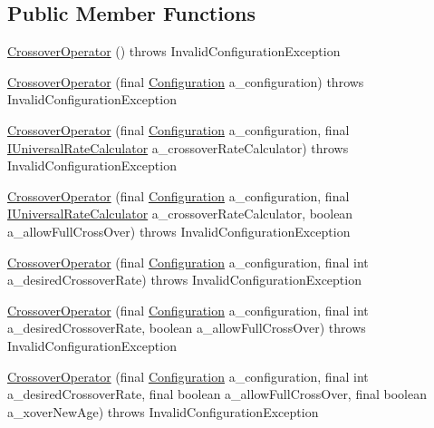 \subsection*{Public Member Functions}
\begin{DoxyCompactItemize}
\item 
\hyperlink{classorg_1_1jgap_1_1impl_1_1_crossover_operator_a1f75f1e7fbc8d7b9332f92f67f72f0c6}{Crossover\-Operator} ()  throws Invalid\-Configuration\-Exception 
\item 
\hyperlink{classorg_1_1jgap_1_1impl_1_1_crossover_operator_ab5689ffd5b3f6e2d06c8d05f6bc5e8bb}{Crossover\-Operator} (final \hyperlink{classorg_1_1jgap_1_1_configuration}{Configuration} a\-\_\-configuration)  throws Invalid\-Configuration\-Exception 
\item 
\hyperlink{classorg_1_1jgap_1_1impl_1_1_crossover_operator_a609bfb00afea32f4b32b7ae3c1889858}{Crossover\-Operator} (final \hyperlink{classorg_1_1jgap_1_1_configuration}{Configuration} a\-\_\-configuration, final \hyperlink{interfaceorg_1_1jgap_1_1_i_universal_rate_calculator}{I\-Universal\-Rate\-Calculator} a\-\_\-crossover\-Rate\-Calculator)  throws Invalid\-Configuration\-Exception 
\item 
\hyperlink{classorg_1_1jgap_1_1impl_1_1_crossover_operator_a55030a95f4c442d19fb0db2f7f949439}{Crossover\-Operator} (final \hyperlink{classorg_1_1jgap_1_1_configuration}{Configuration} a\-\_\-configuration, final \hyperlink{interfaceorg_1_1jgap_1_1_i_universal_rate_calculator}{I\-Universal\-Rate\-Calculator} a\-\_\-crossover\-Rate\-Calculator, boolean a\-\_\-allow\-Full\-Cross\-Over)  throws Invalid\-Configuration\-Exception 
\item 
\hyperlink{classorg_1_1jgap_1_1impl_1_1_crossover_operator_a104345e6601aee5183d9e6411a73522d}{Crossover\-Operator} (final \hyperlink{classorg_1_1jgap_1_1_configuration}{Configuration} a\-\_\-configuration, final int a\-\_\-desired\-Crossover\-Rate)  throws Invalid\-Configuration\-Exception 
\item 
\hyperlink{classorg_1_1jgap_1_1impl_1_1_crossover_operator_a442b1e27d3066fa2463bd193f047aa06}{Crossover\-Operator} (final \hyperlink{classorg_1_1jgap_1_1_configuration}{Configuration} a\-\_\-configuration, final int a\-\_\-desired\-Crossover\-Rate, boolean a\-\_\-allow\-Full\-Cross\-Over)  throws Invalid\-Configuration\-Exception 
\item 
\hyperlink{classorg_1_1jgap_1_1impl_1_1_crossover_operator_aca102ac7c7649f8cff5066c4e48b6d8f}{Crossover\-Operator} (final \hyperlink{classorg_1_1jgap_1_1_configuration}{Configuration} a\-\_\-configuration, final int a\-\_\-desired\-Crossover\-Rate, final boolean a\-\_\-allow\-Full\-Cross\-Over, final boolean a\-\_\-xover\-New\-Age)  throws Invalid\-Configuration\-Exception 

\end{DoxyCompactItemize}
